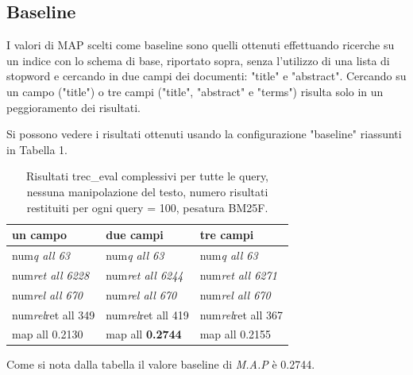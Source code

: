 \documentclass[runningheads]{llncs}
\begin{document}

\subsection{Baseline}
I valori di MAP scelti come baseline sono quelli ottenuti effettuando ricerche su un indice con lo schema di base, riportato sopra, senza l'utilizzo di una lista di stopword e cercando in due campi dei documenti: "title" e "abstract".
Cercando su un campo ("title") o tre campi ("title", "abstract" e "terms") risulta solo in un peggioramento dei risultati.

Si possono vedere i risultati ottenuti usando la configurazione "baseline" riassunti in Tabella 1.
\par


\begin{table}
\centering
\begin{tabular}{lll}
\hline
\textbf{ un campo }           & \textbf{ due campi }           & \textbf{ tre campi }            \\ \hline
 num\textit{q all 63 }       &  num\textit{q all 63 }       &  num\textit{q all 63 }        \\
 num\textit{ret all 6228 }  &  num\textit{ret all 6244 }  &  num\textit{ret all 6271 }   \\
 num\textit{rel all 670 }    &  num\textit{rel all 670 }    &  num\textit{rel all 670 }     \\
 num\textit{rel}ret all 349  &  num\textit{rel}ret all 419  &  num\textit{rel}ret all 367   \\
map all 0.2130               & map all \bf 0.2744               & map all 0.2155 \\ \hline
\end{tabular}

\caption{ Risultati trec\_eval complessivi per tutte le query, nessuna manipolazione del testo, numero risultati restituiti per
ogni query = 100, pesatura BM25F.}
\end{table}

Come si nota dalla tabella il valore baseline di \textit{M.A.P} \`e 0.2744.
\par

%
%
%
%
\end{document}
